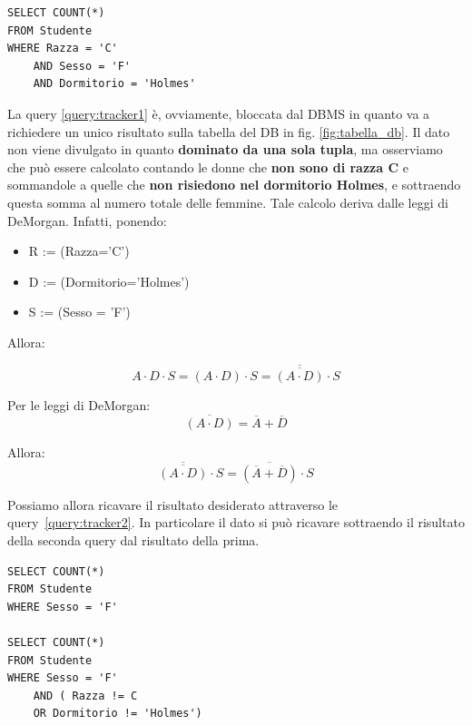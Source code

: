 \begin{algorithm}
\begin{lstlisting}[caption={Esempio di query di tracker non lecita du DB \label{query:tracker1}}] 
SELECT COUNT(*)
FROM Studente
WHERE Razza = 'C'
	AND Sesso = 'F'
	AND Dormitorio = 'Holmes'
\end{lstlisting}
\end{algorithm}

La query \ref{query:tracker1} è, ovviamente, bloccata dal DBMS in quanto va a richiedere un unico risultato sulla tabella del DB in fig. \ref{fig:tabella_db}. Il dato non viene divulgato in quanto \textbf{dominato da una sola tupla}, ma osserviamo che può essere calcolato contando le donne che \textbf{non sono di razza C} e sommandole a quelle che \textbf{non risiedono nel dormitorio Holmes}, e sottraendo questa somma al numero totale delle femmine. Tale calcolo deriva dalle leggi di DeMorgan. Infatti, ponendo:

\begin{itemize}
\item R := (Razza='C')
\item D := (Dormitorio='Holmes')
\item S := (Sesso = 'F')
\end{itemize}

Allora:

\begin{equation}
A \cdot D \cdot S = (A \cdot D) \cdot S =\overline{\overline{(A \cdot D)}} \cdot S
\end{equation}

Per le leggi di DeMorgan:
\begin{equation}
\overline{(A \cdot D)} = \overline{A} + \overline{D}
\end{equation}

Allora:
\begin{equation} \label{eq:tracker}
\overline{\overline{(A \cdot D)}} \cdot S = \overline{(\overline{A} + \overline{D})} \cdot S
\end{equation}

Possiamo allora ricavare il risultato desiderato attraverso le query~\ref{query:tracker2}. In particolare il dato si può ricavare sottraendo il risultato della seconda query dal risultato della prima.
\begin{algorithm}
\begin{lstlisting}[caption={Esempio di query di tracker lecita du DB \label{query:tracker2}}] 
SELECT COUNT(*)
FROM Studente
WHERE Sesso = 'F'
	
SELECT COUNT(*)
FROM Studente
WHERE Sesso = 'F'
	AND ( Razza != C
	OR Dormitorio != 'Holmes')
\end{lstlisting}
\end{algorithm}

